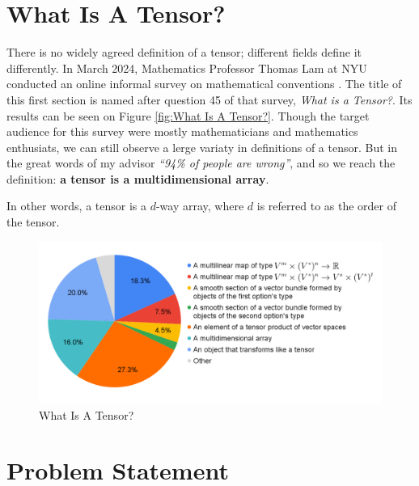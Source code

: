 \documentclass[MS]{wfuthesis}
\begin{document}
        \section{What Is A Tensor?}
            There is no widely agreed definition of a tensor; different fields
            define it differently. In March 2024, Mathematics Professor Thomas
            Lam at NYU conducted an online informal survey on mathematical
            conventions \cite{Math_Conventions_Survey}. The title of this first
            section is named after question 45 of that survey, \textit{What is a
            Tensor?}. Its results can be seen on Figure \ref{fig:What Is A
            Tensor?}. Though the target audience for this survey were mostly
            mathematicians and mathematics enthusiats, we can still observe a
            lerge variaty in definitions of a tensor. But in the great words of
            my advisor \textit{``94\% of people are wrong''}, and so we reach the
            definition: \textbf{a tensor is a multidimensional array}.
            
            In other words, a tensor is a $d$-way array, where $d$ is referred
            to as the order of the tensor.

            \begin{figure}
                \centering
                \includegraphics[width=\textwidth]{Figures/WhatIsATensor.png}
                \caption[Figure \ref{fig:What Is A Tensor?} - What Is A Tensor?]{What Is A Tensor?}
                \label{fig:What Is A Tensor?}
            \end{figure}

        \section{Problem Statement} %
\end{document}
